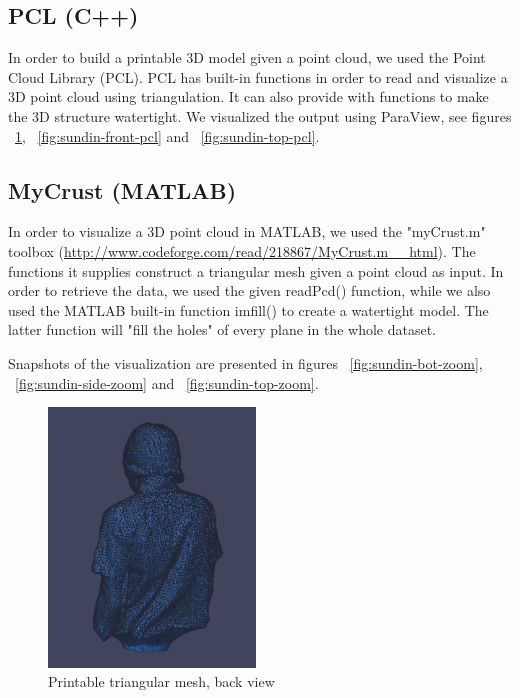 \subsection{PCL (C++)}
In order to build a printable 3D model given a point cloud, we used the Point Cloud Library (PCL)\cite{pcl}. PCL has built-in functions in order to read and visualize a 3D point cloud using triangulation. It can also provide with functions to make the 3D structure watertight.
We visualized the output using ParaView, see figures ~\ref{fig:sundin-back-pcl}, ~\ref{fig:sundin-front-pcl} and ~\ref{fig:sundin-top-pcl}.

\subsection{MyCrust (MATLAB)}
In order to visualize a 3D point cloud in MATLAB, we used the "myCrust.m" toolbox (\url{http://www.codeforge.com/read/218867/MyCrust.m__html}). The functions it supplies construct a triangular mesh given a point cloud as input. In order to retrieve the data, we used the given readPcd() function, while we also used the MATLAB built-in function imfill() to create a watertight model. The latter function will "fill the holes" of every plane in the whole dataset. 

Snapshots of the visualization are presented in figures ~\ref{fig:sundin-bot-zoom}, ~\ref{fig:sundin-side-zoom} and ~\ref{fig:sundin-top-zoom}.

\begin{figure}[ht!]
  \centering
    \includegraphics[width=0.49\textwidth]{figures/sundinPCLback.png}
    \caption{Printable triangular mesh, back view}
    \label{fig:sundin-back-pcl}
\end{figure}

